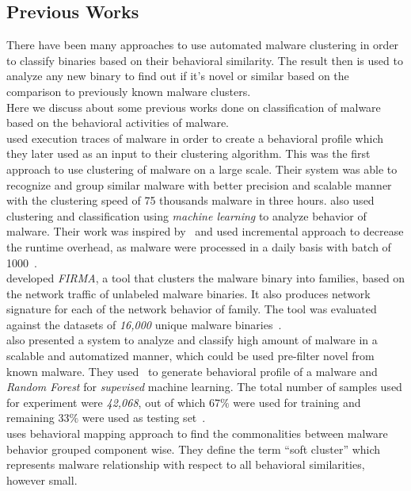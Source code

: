 \subsection{Previous Works}
\label{sub:Previous Works}
There have been many approaches to use automated malware clustering in order to classify binaries based on their behavioral similarity.
The result then is used to analyze any new binary to find out if it's novel or similar based on the comparison to previously known malware clusters.\\
Here we discuss about some previous works done on classification of malware based on the behavioral activities of malware.\\
\textbf{\citeauthor{bayer}} used execution traces of malware in order to create a behavioral profile which they later used as an input to their clustering algorithm.
This was the first approach to use clustering of malware on a large scale.
Their system was able to recognize and group similar malware with better precision and scalable manner with the clustering speed of 75 thousands malware in three hours.
\textbf{\citeauthor{autoana}} also used clustering and classification using \emph{machine learning} to analyze behavior of malware.
Their work was inspired by~\cite[]{bayer} and used incremental approach to decrease the runtime overhead, as malware were processed in a daily basis with batch of 1000~\cite[]{autoana}.\\
\textbf{\citeauthor{firma}} developed \emph{FIRMA}, a tool that clusters the malware binary into families, based on the network traffic of unlabeled malware binaries.
It also produces network signature for each of the network behavior of family.
The tool was evaluated against the datasets of \emph{16,000} unique malware binaries~\cite[]{firma}.\\
\textbf{\citeauthor{pirscoveanu}} also presented a system to analyze and classify high amount of malware in a scalable and automatized manner, which could be used pre-filter novel from known malware.
They used~\cite[Cuckoo]{cuckoo} to generate behavioral profile of a malware and \emph{Random Forest} for \emph{supevised} machine learning.
The total number of samples used for experiment were \emph{42,068}, out of which $67\%$ were used for training and remaining $33\%$ were used as testing set~\cite[]{pirscoveanu}.\\
\textbf{\citeauthor{yavvari}} uses behavioral mapping approach to find the commonalities between malware behavior grouped component wise.
They define the term ``soft cluster'' which represents malware relationship with respect to all behavioral similarities, however small.
